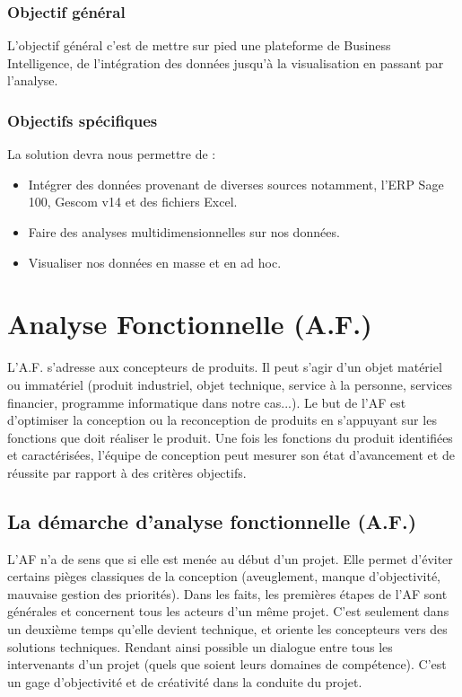 \subsubsection{Objectif général}
L’objectif général c’est de mettre sur pied une plateforme de Business Intelligence, de l’intégration des données jusqu’à la visualisation en passant par l’analyse. 

\subsubsection{Objectifs spécifiques}
La solution devra nous permettre de :
\begin{itemize}
    \item Intégrer des données provenant de diverses sources notamment, l’ERP Sage 100, Gescom v14 et des fichiers Excel.
    \item Faire des analyses multidimensionnelles sur nos données.
    \item Visualiser nos données en masse et en ad hoc.
\end{itemize}










\section{Analyse Fonctionnelle (A.F.)}
L’A.F. s’adresse aux concepteurs de produits. Il peut s’agir d’un objet matériel ou immatériel (produit industriel, objet technique, service à la personne, services financier, programme informatique dans notre cas...). Le but de l’AF est d’optimiser la conception ou la reconception de produits en s’appuyant sur les fonctions que doit réaliser le produit. Une fois les fonctions du produit identifiées et caractérisées, l’équipe de conception peut mesurer son état d’avancement et de réussite par rapport à des critères objectifs.

\subsection{La démarche d’analyse fonctionnelle (A.F.)}
L’AF n’a de sens que si elle est menée au début d’un projet. Elle permet d’éviter certains pièges classiques de la conception (aveuglement, manque d’objectivité, mauvaise gestion des priorités). Dans les faits, les premières étapes de l’AF sont générales et concernent tous les acteurs d’un même projet. C’est seulement dans un deuxième temps qu'elle devient technique, et oriente les concepteurs vers des solutions techniques. Rendant ainsi possible un dialogue entre tous les intervenants d’un projet (quels que soient leurs domaines de compétence). C’est un gage d’objectivité et de créativité dans la conduite du projet.

